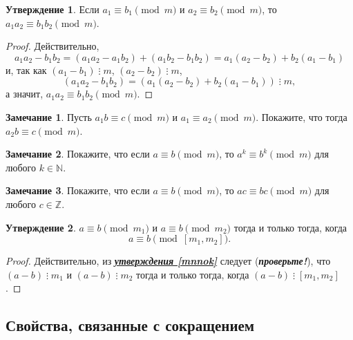 \documentclass[14pt, a4paper]{extarticle}
\theoremstyle{definition}
\newtheorem*{remark}{Замечание}
\newtheorem{statement}{Утверждение}
\newcommand{\divisible}{\mathop{\vdots}}
\begin{document}
	\begin{statement}
	\label{mult}
		Если $a_1\equiv b_1\pmod{m}$ и $a_2\equiv b_2\pmod{m}$, то $a_1a_2\equiv b_1b_2\pmod{m}$.
	\end{statement}
	\begin{proof}
		Действительно, $$a_1a_2-b_1b_2=(a_1a_2-a_1b_2)+(a_1b_2-b_1b_2)=a_1(a_2-b_2)+b_2(a_1-b_1)$$ и, так как $(a_1-b_1)\divisible m$, $(a_2-b_2)\divisible m$, $$(a_1a_2-b_1b_2)=(a_1(a_2-b_2)+b_2(a_1-b_1))\divisible m,$$ а значит, $a_1a_2\equiv b_1b_2\pmod{m}$.
	\end{proof}

	\begin{remark}
		Пусть $a_1b\equiv c\pmod{m}$ и $a_1\equiv a_2\pmod{m}$. Покажите, что тогда $a_2b\equiv c\pmod{m}$.
	\end{remark}

	\begin{remark}
		Покажите, что если $a\equiv b\pmod{m}$, то $a^k\equiv b^k\pmod{m}$ для любого $k\in\mathbb{N}$.
	\end{remark}

	\begin{remark}
		Покажите, что если $a\equiv b\pmod{m}$, то $ac\equiv bc\pmod{m}$ для любого $c\in\mathbb{Z}$. 
	\end{remark}

	\begin{statement}
		$a\equiv b\pmod{m_1}$ и $a\equiv b\pmod{m_2}$ тогда и только тогда, когда $$a\equiv b\pmod{[m_1,m_2]}.$$
	\end{statement}
	\begin{proof}
		Действительно, из \hyperref[mnnok]{\textbf{\textit{утверждения \ref*{mnnok}}}} следует (\textbf{\textit{про\-верьте!}}), что $(a-b)\divisible m_1$ и $(a-b)\divisible m_2$ тогда и только тогда, когда $(a-b)\divisible[m_1,m_2]$.
	\end{proof}

\subsection{Свойства, связанные с сокращением}
\label{skrsr}
\end{document}
